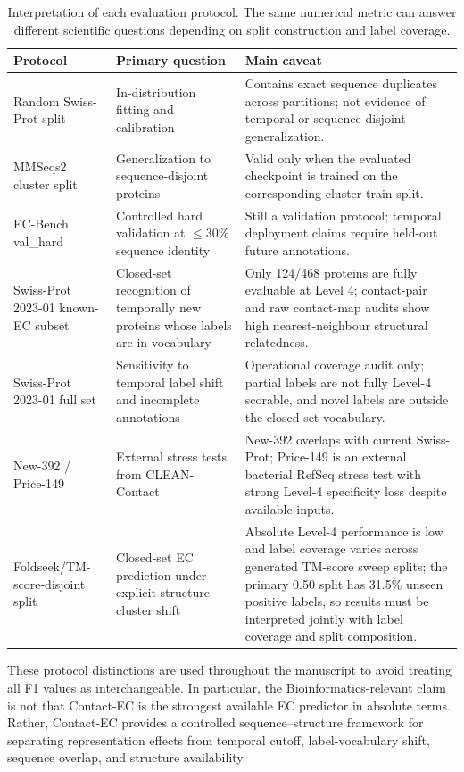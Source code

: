 \documentclass[11pt,a4paper]{article}
\begin{document}
\begin{table}[htbp]
\centering
\caption{Interpretation of each evaluation protocol. The same numerical metric can
answer different scientific questions depending on split construction and label
coverage.}
\label{tab:protocol_interpretation}
\setlength{\tabcolsep}{5pt}
\begin{tabular}{p{3.2cm}p{4.1cm}p{5.2cm}}
\toprule
\textbf{Protocol} & \textbf{Primary question} & \textbf{Main caveat} \\
\midrule
Random Swiss-Prot split &
In-distribution fitting and calibration &
Contains exact sequence duplicates across partitions; not evidence of temporal or
sequence-disjoint generalization. \\
MMSeqs2 cluster split &
Generalization to sequence-disjoint proteins &
Valid only when the evaluated checkpoint is trained on the corresponding
cluster-train split. \\
EC-Bench val\_hard &
Controlled hard validation at $\leq$30\% sequence identity &
Still a validation protocol; temporal deployment claims require held-out future
annotations. \\
Swiss-Prot 2023-01 known-EC subset &
Closed-set recognition of temporally new proteins whose labels are in vocabulary &
Only 124/468 proteins are fully evaluable at Level 4; contact-pair and raw
contact-map audits show high nearest-neighbour structural relatedness. \\
Swiss-Prot 2023-01 full set &
Sensitivity to temporal label shift and incomplete annotations &
Operational coverage audit only; partial labels are not fully Level-4 scorable,
and novel labels are outside the closed-set vocabulary. \\
New-392 / Price-149 &
External stress tests from CLEAN-Contact &
New-392 overlaps with current Swiss-Prot; Price-149 is an external bacterial
RefSeq stress test with strong Level-4 specificity loss despite available inputs. \\
Foldseek/TM-score-disjoint split &
Closed-set EC prediction under explicit structure-cluster shift &
Absolute Level-4 performance is low and label coverage varies across generated
TM-score sweep splits; the primary 0.50 split has 31.5\% unseen positive labels,
so results must be interpreted jointly with label coverage and split composition. \\
\bottomrule
\end{tabular}
\end{table}

These protocol distinctions are used throughout the manuscript to avoid treating
all F1 values as interchangeable. In particular, the Bioinformatics-relevant claim
is not that Contact-EC is the strongest available EC predictor in absolute terms.
Rather, Contact-EC provides a controlled sequence--structure framework for
separating representation effects from temporal cutoff, label-vocabulary shift,
sequence overlap, and structure availability.
\end{document}
